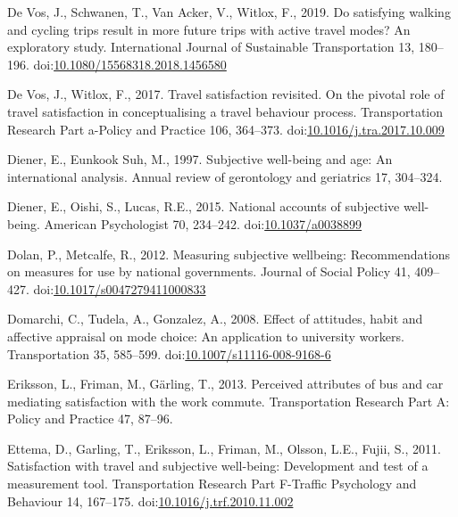 \documentclass[]{elsarticle} %
\begin{document}
\leavevmode\hypertarget{ref-Devos2019satisfying}{}%
De Vos, J., Schwanen, T., Van Acker, V., Witlox, F., 2019. Do satisfying
walking and cycling trips result in more future trips with active travel
modes? An exploratory study. International Journal of Sustainable
Transportation 13, 180--196.
doi:\href{https://doi.org/10.1080/15568318.2018.1456580}{10.1080/15568318.2018.1456580}

\leavevmode\hypertarget{ref-Devos2017travel}{}%
De Vos, J., Witlox, F., 2017. Travel satisfaction revisited. On the
pivotal role of travel satisfaction in conceptualising a travel
behaviour process. Transportation Research Part a-Policy and Practice
106, 364--373.
doi:\href{https://doi.org/10.1016/j.tra.2017.10.009}{10.1016/j.tra.2017.10.009}

\leavevmode\hypertarget{ref-Diener1997subjective}{}%
Diener, E., Eunkook Suh, M., 1997. Subjective well-being and age: An
international analysis. Annual review of gerontology and geriatrics 17,
304--324.

\leavevmode\hypertarget{ref-Diener2015national}{}%
Diener, E., Oishi, S., Lucas, R.E., 2015. National accounts of
subjective well-being. American Psychologist 70, 234--242.
doi:\href{https://doi.org/10.1037/a0038899}{10.1037/a0038899}

\leavevmode\hypertarget{ref-Dolan2012measuring}{}%
Dolan, P., Metcalfe, R., 2012. Measuring subjective wellbeing:
Recommendations on measures for use by national governments. Journal of
Social Policy 41, 409--427.
doi:\href{https://doi.org/10.1017/s0047279411000833}{10.1017/s0047279411000833}

\leavevmode\hypertarget{ref-Domarchi2008effect}{}%
Domarchi, C., Tudela, A., Gonzalez, A., 2008. Effect of attitudes, habit
and affective appraisal on mode choice: An application to university
workers. Transportation 35, 585--599.
doi:\href{https://doi.org/10.1007/s11116-008-9168-6}{10.1007/s11116-008-9168-6}

\leavevmode\hypertarget{ref-Eriksson2013perceived}{}%
Eriksson, L., Friman, M., Gärling, T., 2013. Perceived attributes of bus
and car mediating satisfaction with the work commute. Transportation
Research Part A: Policy and Practice 47, 87--96.

\leavevmode\hypertarget{ref-Ettema2011satisfaction}{}%
Ettema, D., Garling, T., Eriksson, L., Friman, M., Olsson, L.E., Fujii,
S., 2011. Satisfaction with travel and subjective well-being:
Development and test of a measurement tool. Transportation Research Part
F-Traffic Psychology and Behaviour 14, 167--175.
doi:\href{https://doi.org/10.1016/j.trf.2010.11.002}{10.1016/j.trf.2010.11.002}
\end{document}
